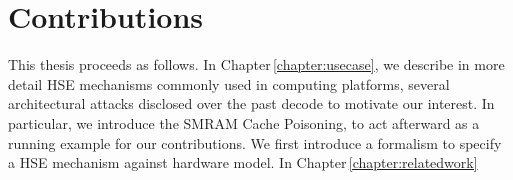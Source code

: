 \section{Contributions}

This thesis proceeds as follows. In Chapter\,\ref{chapter:usecase}, we describe
in more detail HSE mechanisms commonly used in computing platforms, several
architectural attacks disclosed over the past decode to motivate our interest.
%
In particular, we introduce the SMRAM Cache Poisoning, to act afterward as a
running example for our contributions.
%
We first introduce a formalism to specify a HSE mechanism against hardware
model.
%
In Chapter\,\ref{chapter:relatedwork}
